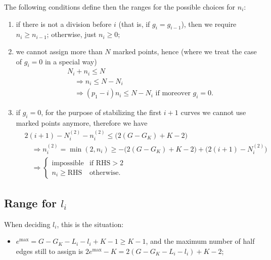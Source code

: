 \documentclass{amsart}
\theoremstyle{plain}
\theoremstyle{definition}
\DeclareMathOperator{\MAX}{max}
\begin{document}
The following conditions define then the ranges for the possible
choices for $n_i$:

\begin{enumerate}
\item if there is not a division before $i$ (that is, if $g_i =
  g_{i-1}$), then we require $n_i \geq n_{i-1}$; otherwise, just $n_i
  \geq 0$;
\item we cannot assign more than $N$ marked points, hence (where we
  treat the case of $g_i = 0$ in a special way)
  \begin{align*}
    &N_i + n_i \leq N\\
    &\quad\Rightarrow n_i \leq N - N_i\\
    &\quad\Rightarrow (p_1 - i)n_i \leq N - N_i\text{ if moreover $g_i = 0$.}
  \end{align*}
\item if $g_i = 0$, for the purpose of stabilizing the first $i+1$
  curves we cannot use marked points anymore, therefore we have
  \begin{align*}
    &2 (i+1) - N^{(2)}_i - n^{(2)}_i \leq \bigl(2(G - G_K) + K - 2\bigr)\\
    &\quad\Rightarrow n^{(2)}_i = \min(2, n_i) \geq - \bigl(2(G - G_K) + K - 2) + (2(i+1) - N^{(2)}_i\bigr)\\
    &\quad\Rightarrow
    \begin{cases}
      \text{impossible} & \text{if $\mathrm{RHS} > 2$}\\
      n_i \geq \mathrm{RHS} & \text{otherwise.}
    \end{cases}
  \end{align*}
\end{enumerate}



\subsection{Range for $l_i$}

When deciding $l_{i}$, this is the situation:
\begin{itemize}
\item $e^{\MAX} = G - G_K - L_i - l_i + K - 1 \geq K-1$, and the
  maximum number of half edges still to assign is $2e^{\MAX} - K = 2(G
  - G_K - L_i - l_i) + K - 2$;
\end{itemize}
\end{document}
